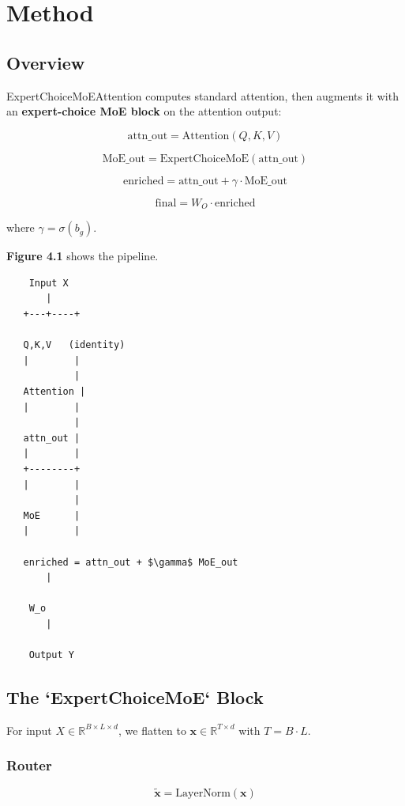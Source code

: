 \section{Method}

\subsection{Overview}

ExpertChoiceMoEAttention computes standard attention, then augments it with 
an \textbf{expert-choice MoE block} on the attention output:

\[
\text{attn\_out} = \text{Attention}(Q, K, V)
\tag{4.1}
\]

\[
\text{MoE\_out} = \text{ExpertChoiceMoE}(\text{attn\_out})
\tag{4.2}
\]

\[
\text{enriched} = \text{attn\_out} + \gamma \cdot \text{MoE\_out}
\tag{4.3}
\]

\[
\text{final} = W_O \cdot \text{enriched}
\tag{4.4}
\]

where $\gamma = \sigma(b_g)$.

\textbf{Figure 4.1} shows the pipeline.

\begin{lstlisting}
    Input X
       |
   +---+----+
             
   Q,K,V   (identity)
   |        |
            |
   Attention |
   |        |
            |
   attn_out |
   |        |
   +--------+
   |        |
            |
   MoE      |
   |        |
             
   enriched = attn_out + $\gamma$ MoE_out
       |
        
    W_o
       |
        
    Output Y
\end{lstlisting}

\subsection{The `ExpertChoiceMoE` Block}

For input $X \in \mathbb{R}^{B \times L \times d}$, we flatten to 
$\mathbf{x} \in \mathbb{R}^{T \times d}$ with $T = B \cdot L$.

\subsubsection{Router}

\[
\tilde{\mathbf{x}} = \text{LayerNorm}(\mathbf{x})
\tag{4.5}
\]

